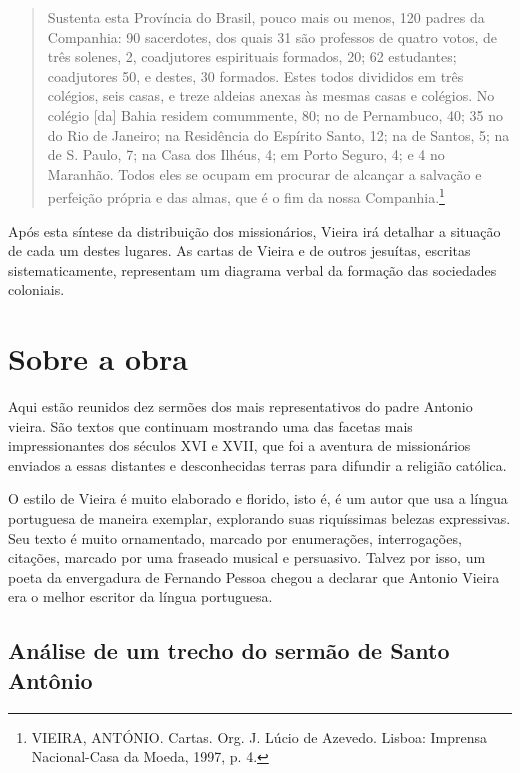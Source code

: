 \begin{quote}
Sustenta esta Província do Brasil, pouco mais ou menos, 120 padres da
Companhia: 90 sacerdotes, dos quais 31 são professos de quatro votos, de
três solenes, 2, coadjutores espirituais formados, 20; 62 estudantes;
coadjutores 50, e destes, 30 formados. Estes todos divididos em três
colégios, seis casas, e treze aldeias anexas às mesmas casas e colégios.
No colégio {[}da{]} Bahia residem comummente, 80; no de Pernambuco, 40;
35 no do Rio de Janeiro; na Residência do Espírito Santo, 12; na de
Santos, 5; na de S. Paulo, 7; na Casa dos Ilhéus, 4; em Porto Seguro, 4;
e 4 no Maranhão. Todos eles se ocupam em procurar de alcançar a salvação
e perfeição própria e das almas, que é o fim da nossa
Companhia.\footnote{VIEIRA, ANTÓNIO. Cartas. Org. J. Lúcio de Azevedo.
  Lisboa: Imprensa Nacional-Casa da Moeda, 1997, p. 4.}
\end{quote}

Após esta síntese da distribuição dos missionários, Vieira irá detalhar
a situação de cada um destes lugares. As cartas de Vieira e de outros
jesuítas, escritas sistematicamente, representam um diagrama verbal da
formação das sociedades coloniais.

\section{Sobre a obra}

Aqui estão reunidos dez sermões dos mais representativos do padre Antonio vieira.
São textos que continuam mostrando uma das facetas mais impressionantes dos
séculos XVI e XVII, que foi a aventura de missionários enviados a essas
distantes e desconhecidas terras para difundir a religião católica.

O estilo de Vieira é muito elaborado e florido, isto é, é um autor que
usa a língua portuguesa de maneira exemplar, explorando suas riquíssimas
belezas expressivas. Seu texto é muito ornamentado, marcado por
enumerações, interrogações, citações, marcado por uma fraseado musical e
persuasivo. Talvez por isso, um poeta da envergadura de Fernando Pessoa chegou a declarar que Antonio Vieira era o melhor escritor da língua portuguesa.

\subsection{Análise de um trecho do sermão de Santo Antônio}


